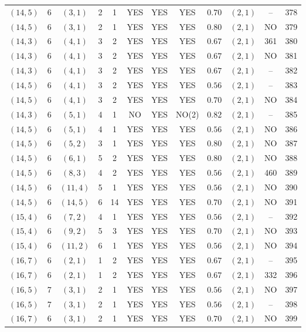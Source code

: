 \begin{longtable}{|c|c|c|c|c|c|c|c|c|c|c|c|}
$(14,5)$ & 6 & $(3,1)$ & 2 & 1 & YES & YES & YES & $0.70$ & $(2,1)$ & -- & 378\\
$(14,5)$ & 6 & $(3,1)$ & 2 & 1 & YES & YES & YES & $0.80$ & $(2,1)$ & NO & 379\\
$(14,3)$ & 6 & $(4,1)$ & 3 & 2 & YES & YES & YES & $0.67$ & $(2,1)$ & 361 & 380\\
$(14,3)$ & 6 & $(4,1)$ & 3 & 2 & YES & YES & YES & $0.67$ & $(2,1)$ & NO & 381\\
$(14,3)$ & 6 & $(4,1)$ & 3 & 2 & YES & YES & YES & $0.67$ & $(2,1)$ & -- & 382\\
$(14,5)$ & 6 & $(4,1)$ & 3 & 2 & YES & YES & YES & $0.56$ & $(2,1)$ & -- & 383\\
$(14,5)$ & 6 & $(4,1)$ & 3 & 2 & YES & YES & YES & $0.70$ & $(2,1)$ & NO & 384\\
$(14,3)$ & 6 & $(5,1)$ & 4 & 1 & NO & YES & NO(2) & $0.82$ & $(2,1)$ & -- & 385\\
$(14,5)$ & 6 & $(5,1)$ & 4 & 1 & YES & YES & YES & $0.56$ & $(2,1)$ & NO & 386\\
$(14,5)$ & 6 & $(5,2)$ & 3 & 1 & YES & YES & YES & $0.80$ & $(2,1)$ & NO & 387\\
$(14,5)$ & 6 & $(6,1)$ & 5 & 2 & YES & YES & YES & $0.80$ & $(2,1)$ & NO & 388\\
$(14,5)$ & 6 & $(8,3)$ & 4 & 2 & YES & YES & YES & $0.56$ & $(2,1)$ & 460 & 389\\
$(14,5)$ & 6 & $(11,4)$ & 5 & 1 & YES & YES & YES & $0.56$ & $(2,1)$ & NO & 390\\
$(14,5)$ & 6 & $(14,5)$ & 6 & 14 & YES & YES & YES & $0.70$ & $(2,1)$ & NO & 391\\
$(15,4)$ & 6 & $(7,2)$ & 4 & 1 & YES & YES & YES & $0.56$ & $(2,1)$ & -- & 392\\
$(15,4)$ & 6 & $(9,2)$ & 5 & 3 & YES & YES & YES & $0.70$ & $(2,1)$ & NO & 393\\
$(15,4)$ & 6 & $(11,2)$ & 6 & 1 & YES & YES & YES & $0.56$ & $(2,1)$ & NO & 394\\
$(16,7)$ & 6 & $(2,1)$ & 1 & 2 & YES & YES & YES & $0.67$ & $(2,1)$ & -- & 395\\
$(16,7)$ & 6 & $(2,1)$ & 1 & 2 & YES & YES & YES & $0.67$ & $(2,1)$ & 332 & 396\\
$(16,5)$ & 7 & $(3,1)$ & 2 & 1 & YES & YES & YES & $0.56$ & $(2,1)$ & NO & 397\\
$(16,5)$ & 7 & $(3,1)$ & 2 & 1 & YES & YES & YES & $0.56$ & $(2,1)$ & -- & 398\\
$(16,7)$ & 6 & $(3,1)$ & 2 & 1 & YES & YES & YES & $0.70$ & $(2,1)$ & NO & 399\\

\end{longtable}
